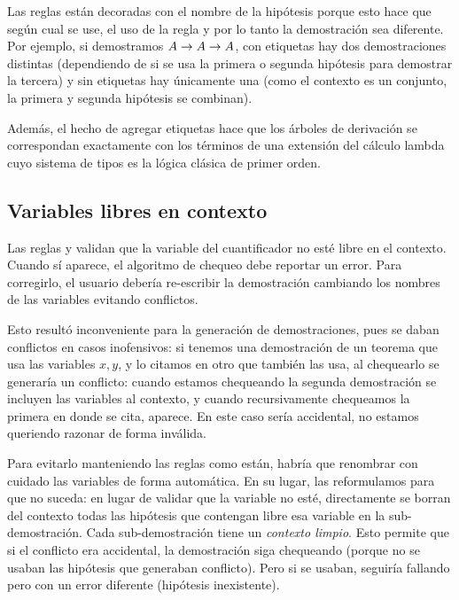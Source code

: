 \begin{obs*}
    Las reglas están decoradas con el nombre de la hipótesis porque esto hace que según cual se use, el uso de la regla y por lo tanto la demostración sea diferente. Por ejemplo, si demostramos $A \to A \to A$, con etiquetas hay dos demostraciones distintas (dependiendo de si se usa la primera o segunda hipótesis para demostrar la tercera) y sin etiquetas hay únicamente una (como el contexto es un conjunto, la primera y segunda hipótesis se combinan).
    
    Además, el hecho de agregar etiquetas hace que los árboles de derivación se correspondan exactamente con los términos de una extensión del cálculo lambda cuyo sistema de tipos es la lógica clásica de primer orden.
\end{obs*}

\subsection{Variables libres en contexto}

Las reglas  y  validan que la variable del cuantificador no esté libre en el contexto. Cuando sí aparece, el algoritmo de chequeo debe reportar un error. Para corregirlo, el usuario debería re-escribir la demostración cambiando los nombres de las variables evitando conflictos.

Esto resultó inconveniente para la generación de demostraciones, pues se daban conflictos en casos inofensivos: si tenemos una demostración de un teorema que usa las variables $x, y$, y lo citamos en otro que también las usa, al chequearlo se generaría un conflicto: cuando estamos chequeando la segunda demostración se incluyen las variables al contexto, y cuando recursivamente chequeamos la primera en donde se cita, aparece. En este caso sería accidental, no estamos queriendo razonar de forma inválida.

Para evitarlo manteniendo las reglas como están, habría que renombrar con cuidado las variables de forma automática. En su lugar, las reformulamos para que no suceda: en lugar de validar que la variable no esté, directamente se borran del contexto todas las hipótesis que contengan libre esa variable en la sub-demostración. Cada sub-demostración tiene un \textit{contexto limpio}. Esto permite que si el conflicto era accidental, la demostración siga chequeando (porque no se usaban las hipótesis que generaban conflicto). Pero si se usaban, seguiría fallando pero con un error diferente (hipótesis inexistente).

